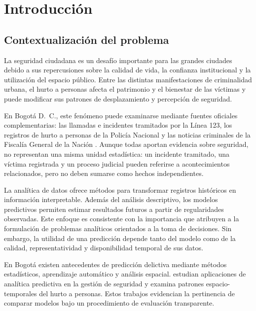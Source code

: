 
\section{Introducción}

\subsection{Contextualización del problema}

La seguridad ciudadana es un desafío importante para las grandes ciudades debido a sus repercusiones sobre la calidad de vida, la confianza institucional y la utilización del espacio público. Entre las distintas manifestaciones de criminalidad urbana, el hurto a personas afecta el patrimonio y el bienestar de las víctimas y puede modificar sus patrones de desplazamiento y percepción de seguridad.

En Bogotá D.~C., este fenómeno puede examinarse mediante fuentes oficiales complementarias: las llamadas e incidentes tramitados por la Línea 123, los registros de hurto a personas de la Policía Nacional y las noticias criminales de la Fiscalía General de la Nación \citep{linea123,policia,fiscalia}. Aunque todas aportan evidencia sobre seguridad, no representan una misma unidad estadística: un incidente tramitado, una víctima registrada y un proceso judicial pueden referirse a acontecimientos relacionados, pero no deben sumarse como hechos independientes.

La analítica de datos ofrece métodos para transformar registros históricos en información interpretable. Además del análisis descriptivo, los modelos predictivos permiten estimar resultados futuros a partir de regularidades observadas. Este enfoque es consistente con la importancia que \citet{provost2013} atribuyen a la formulación de problemas analíticos orientados a la toma de decisiones. Sin embargo, la utilidad de una predicción depende tanto del modelo como de la calidad, representatividad y disponibilidad temporal de sus datos.

En Bogotá existen antecedentes de predicción delictiva mediante métodos estadísticos, aprendizaje automático y análisis espacial. \citet{riascos2020} estudian aplicaciones de analítica predictiva en la gestión de seguridad y \citet{martinez2025} examina patrones espacio-temporales del hurto a personas. Estos trabajos evidencian la pertinencia de comparar modelos bajo un procedimiento de evaluación transparente.

